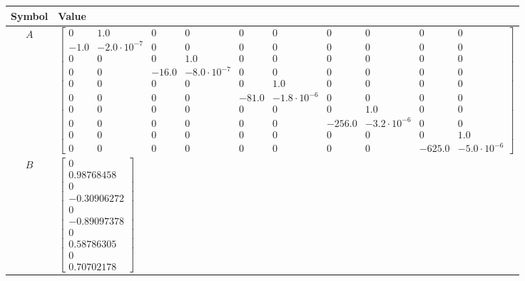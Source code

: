 \begin{tabular}{cl}
\hline
  Symbol  & Value                                                                                                                                                                                                                                                                                                                                                                                                                                                                                                                                                             \\
\hline
   $A$    & $\left[\begin{matrix}0 & 1.0 & 0 & 0 & 0 & 0 & 0 & 0 & 0 & 0\\-1.0 & -2.0 \cdot 10^{-7} & 0 & 0 & 0 & 0 & 0 & 0 & 0 & 0\\0 & 0 & 0 & 1.0 & 0 & 0 & 0 & 0 & 0 & 0\\0 & 0 & -16.0 & -8.0 \cdot 10^{-7} & 0 & 0 & 0 & 0 & 0 & 0\\0 & 0 & 0 & 0 & 0 & 1.0 & 0 & 0 & 0 & 0\\0 & 0 & 0 & 0 & -81.0 & -1.8 \cdot 10^{-6} & 0 & 0 & 0 & 0\\0 & 0 & 0 & 0 & 0 & 0 & 0 & 1.0 & 0 & 0\\0 & 0 & 0 & 0 & 0 & 0 & -256.0 & -3.2 \cdot 10^{-6} & 0 & 0\\0 & 0 & 0 & 0 & 0 & 0 & 0 & 0 & 0 & 1.0\\0 & 0 & 0 & 0 & 0 & 0 & 0 & 0 & -625.0 & -5.0 \cdot 10^{-6}\end{matrix}\right]$ \\
   $B$    & $\left[\begin{matrix}0\\0.98768458\\0\\-0.30906272\\0\\-0.89097378\\0\\0.58786305\\0\\0.70702178\end{matrix}\right]$                                                                                                                                                                                                                                                                                                                                                                                                                                              \\

\end{tabular}
